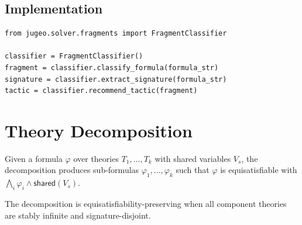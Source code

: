 \documentclass[11pt]{article}
\begin{document}
\subsection{Implementation}

\begin{lstlisting}[caption={Fragment classification.},label=lst:classify]
from jugeo.solver.fragments import FragmentClassifier

classifier = FragmentClassifier()
fragment = classifier.classify_formula(formula_str)
signature = classifier.extract_signature(formula_str)
tactic = classifier.recommend_tactic(fragment)
\end{lstlisting}


\section{Theory Decomposition}\label{sec:decomposition}

\begin{definition}\label{def:decomp}
Given a formula $\varphi$ over theories $T_1, \ldots, T_k$
with shared variables $V_s$, the decomposition produces
sub-formulas $\varphi_1, \ldots, \varphi_k$ such that
$\varphi$ is equisatisfiable with $\bigwedge_i \varphi_i
\wedge \mathsf{shared}(V_s)$.
\end{definition}

\begin{theorem}\label{thm:decomp}
The decomposition is equisatisfiability-preserving when all
component theories are stably infinite and signature-disjoint.
\end{theorem}
\end{document}
